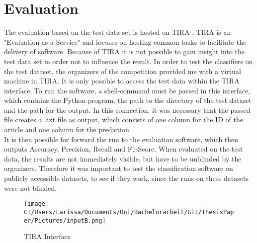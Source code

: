 \documentclass[a4paper, 11pt,titlepage,oneside,openany]{book}
\begin{document}
\chapter{Evaluation}
The evaluation based on the test data set is hosted on TIRA \cite{tira}. TIRA is an "Evaluation as a Service" \cite{evaluationasaservice} and focuses on hosting common tasks to facilitate the delivery of software. Because of TIRA it is not possible to gain insight into the test data set in order not to influence the result.
In order to test the classifiers on the test dataset, the organizers of the competition provided me with a virtual machine in TIRA. It is only possible to access the test data within the TIRA interface. To run the software, a shell-command must be passed in this interface, which contains the Python program, the path to the directory of the test dataset and the path for the output. In this connection, it was necessary that the passed file creates a .txt file as output, which consists of one column for the ID of the article and one column for the prediction. \\
\noindent It is then possible for forward the run to the evaluation software, which then outputs Accuracy, Precision, Recall and F1-Score. When evaluated on the test data, the results are not immediately visible, but have to be unblinded by the organizers. Therefore it was important to test the classification software on publicly accessible datasets, to see if they work, since the runs on these datasets were not blinded. 
\begin{figure}[h]
	\centering
	\texttt{[image: C:/Users/Larissa/Documents/Uni/Bachelorarbeit/Git/ThesisPaper/Pictures/inputB.png]}
	\caption{TIRA Interface}
\end{figure}
\end{document}
